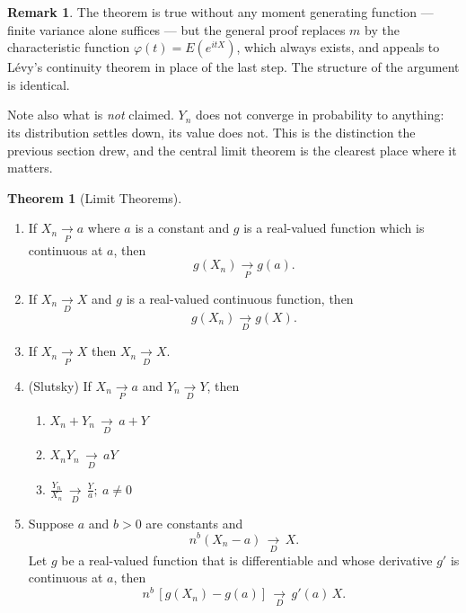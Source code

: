 \documentclass[12pt,a4paper]{report}
\theoremstyle{definition}
\newtheorem{thm}{Theorem}[section]
\newtheorem*{remark}{Remark}
\begin{document}
\begin{remark}
The theorem is true without any moment generating function --- finite variance
alone suffices --- but the general proof replaces $m$ by the characteristic
function $\varphi(t)=E\left(e^{itX}\right)$, which always exists, and appeals to
L\'evy's continuity theorem in place of the last step. The structure of the
argument is identical.

Note also what is \emph{not} claimed. $Y_n$ does not converge in probability to
anything: its distribution settles down, its value does not. This is the
distinction the previous section drew, and the central limit theorem is the
clearest place where it matters.
\end{remark}

\begin{thm}[Limit Theorems]
\begin{enumerate}
\item If $X_n \underset{P}{\longrightarrow} a$ where $a$ is a constant and $g$ is a real-valued function which is continuous at $a$, then \[g(X_n) \underset{P}{\longrightarrow} g(a).\]

\item If $X_n \underset{D}{\longrightarrow} X$ and $g$ is a real-valued continuous function, then \[g(X_n) \underset{D}{\longrightarrow} g(X).\]

\item If $X_n \underset{P}{\longrightarrow} X$ then $X_n \underset{D}{\longrightarrow} X$.

\item (Slutsky) If $X_n \underset{P}{\longrightarrow} a$ and $Y_n \underset{D}{\longrightarrow} Y$, then 
   \begin{enumerate}
        \item[(a)] $X_n + Y_n \, \underset{D}{\longrightarrow}\, a + Y$
        \item[(b)] $X_nY_n \, \underset{D}{\longrightarrow}\, aY$
        \item[(c)] $\frac{Y_n}{X_n} \, \underset{D}{\longrightarrow} \, \frac{Y}{a};\  a\neq 0$
   \end{enumerate}
   
\item Suppose $a$ and $b>0$ are constants and \[n^b\left(X_n - a\right) \, \underset{D}{\longrightarrow}\, X.\] Let $g$ be a real-valued function that is differentiable and whose derivative $g'$ is continuous at $a$, then  \[n^b\, \left[g(X_n) - g(a)\right] \, \underset{D}{\longrightarrow}\, g'(a)\, X.\]
\end{enumerate}
\end{thm}
\end{document}
